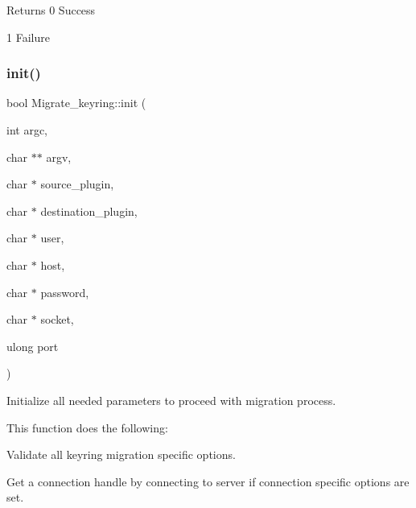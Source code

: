 \begin{DoxyReturn}{Returns}
0 Success 

1 Failure 
\end{DoxyReturn}
\mbox{\label{classMigrate__keyring_ad9053c75711365701f3462e85165053b}} 
\subsubsection{\texorpdfstring{init()}{init()}}
{\footnotesize\ttfamily bool Migrate\+\_\+keyring\+::init (\begin{DoxyParamCaption}\item[{int}]{argc,  }\item[{char $\ast$$\ast$}]{argv,  }\item[{char $\ast$}]{source\+\_\+plugin,  }\item[{char $\ast$}]{destination\+\_\+plugin,  }\item[{char $\ast$}]{user,  }\item[{char $\ast$}]{host,  }\item[{char $\ast$}]{password,  }\item[{char $\ast$}]{socket,  }\item[{ulong}]{port }\end{DoxyParamCaption})}

Initialize all needed parameters to proceed with migration process.

This function does the following\+:
\begin{DoxyEnumerate}
\item Validate all keyring migration specific options.
\item Get a connection handle by connecting to server if connection specific options are set.
\end{DoxyEnumerate}


